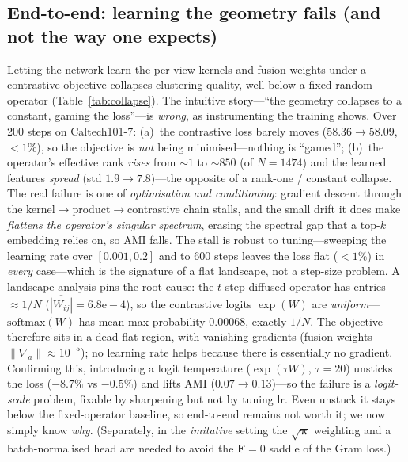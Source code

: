 \documentclass[10pt,twocolumn]{article}
\newcommand{\bp}{\boldsymbol{\pi}}
\begin{document}
\subsection{End-to-end: learning the geometry fails (and not the way one expects)}\label{sec:collapse}
Letting the network learn the per-view kernels and fusion weights under a contrastive objective
collapses clustering quality, well below a fixed random operator (Table~\ref{tab:collapse}). The
intuitive story---``the geometry collapses to a constant, gaming the loss''---is \emph{wrong}, as
instrumenting the training shows. Over 200 steps on Caltech101-7: (a)~the contrastive loss barely
moves ($58.36\!\to\!58.09$, ${<}1\%$), so the objective is \emph{not} being minimised---nothing is
``gamed''; (b)~the operator's effective rank \emph{rises} from ${\sim}1$ to ${\sim}850$ (of $N{=}1474$)
and the learned features \emph{spread} (std $1.9\!\to\!7.8$)---the opposite of a rank-one / constant
collapse. The real failure is one of \emph{optimisation and conditioning}: gradient descent through the
kernel$\to$product$\to$contrastive chain stalls, and the small drift it does make \emph{flattens the
operator's singular spectrum}, erasing the spectral gap that a top-$k$ embedding relies on, so AMI
falls. The stall is robust to tuning---sweeping the learning rate over $[0.001,0.2]$ and to 600 steps leaves
the loss flat ($<1\%$) in \emph{every} case---which is the signature of a flat landscape, not a
step-size problem. A landscape analysis pins the root cause: the $t$-step diffused operator has
entries ${\approx}1/N$ ($\overline{|W_{ij}|}{=}6.8\mathrm{e}{-}4$), so the contrastive logits
$\exp(W)$ are \emph{uniform}---$\mathrm{softmax}(W)$ has mean max-probability $0.00068$, exactly
$1/N$. The objective therefore sits in a dead-flat region, with vanishing gradients (fusion weights
$\lVert\nabla_a\rVert{\approx}10^{-5}$); no learning rate helps because there is essentially no
gradient. Confirming this, introducing a logit temperature ($\exp(\tau W)$, $\tau{=}20$) unsticks the
loss ($-8.7\%$ vs $-0.5\%$) and lifts AMI ($0.07{\to}0.13$)---so the failure is a \emph{logit-scale}
problem, fixable by sharpening but not by tuning lr. Even unstuck it stays below the fixed-operator
baseline, so end-to-end remains not worth it; we now simply know \emph{why}.
(Separately, in the \emph{imitative} setting the $\sqrt{\bp}$ weighting and a batch-normalised head are
needed to avoid the $\mathbf{F}{=}0$ saddle of the Gram loss.)
\end{document}
